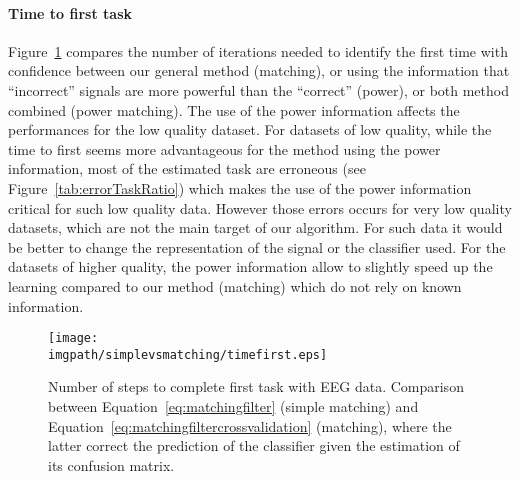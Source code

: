 



\paragraph{Time to first task} Figure~\ref{fig:timefirst_simplevsmatching} compares the number of iterations needed to identify the first time with confidence between our general method (matching), or using the information that ``incorrect'' signals are more powerful than the ``correct'' (power), or both method combined (power matching). The use of the power information affects the performances for the low quality dataset. For datasets of low quality, while the time to first seems more advantageous for the method using the power information, most of the estimated task are erroneous (see Figure~\ref{tab:errorTaskRatio}) which makes the use of the power information critical for such low quality data. However those errors occurs for very low quality datasets, which are not the main target of our algorithm. For such data it would be better to change the representation of the signal or the classifier used. For the datasets of higher quality, the power information allow to slightly speed up the learning compared to our method (matching) which do not rely on known information. 

\begin{figure}[!ht]
\centering
\texttt{[image: \\imgpath/simplevsmatching/timefirst.eps]}
\caption{Number of steps to complete first task with EEG data. Comparison between Equation~\ref{eq:matchingfilter} (simple matching) and Equation~\ref{eq:matchingfiltercrossvalidation} (matching), where the latter correct the prediction of the classifier given the estimation of its confusion matrix. 
}
\label{fig:timefirst_simplevsmatching}
\end{figure} 

